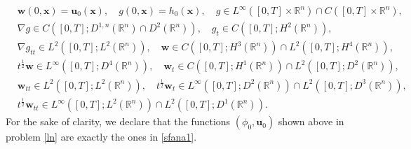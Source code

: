 \documentclass[11pt,reqno]{amsart}
\numberwithin{rk}{section}
\numberwithin{prop}{section}
\numberwithin{mydef}{section}
\numberwithin{lem}{section}
\numberwithin{equation}{section}
\numberwithin{thm}{section}
\begin{document}
\begin{equation*}
\begin{aligned}
&\boldsymbol{w}(0,\boldsymbol{x})=\boldsymbol{u}_0(\boldsymbol{x}),\quad g(0,\boldsymbol{x})=h_0(\boldsymbol{x}),\quad g\in L^\infty([0,T]\times \mathbb{R}^n)\cap C([0,T]\times \mathbb{R}^n),\\
& \nabla g\in C([0,T]; D^{1,n}(\mathbb{R}^n)\cap D^2(\mathbb{R}^n)),\quad  g_t\in C([0,T];H^2(\mathbb{R}^n)),\\
&\nabla g_{tt}\in L^2([0,T];L^2(\mathbb{R}^n)),\quad  \boldsymbol{w}\in C([0,T];H^3(\mathbb{R}^n))\cap L^2([0,T];H^4(\mathbb{R}^n)),\\ 
&t^{\frac{1}{2}}\boldsymbol{w}\in L^\infty([0,T];D^4(\mathbb{R}^n)),\quad \boldsymbol{w}_t\in C([0,T];H^1(\mathbb{R}^n))\cap L^2([0,T];D^2(\mathbb{R}^n)),\\
& \boldsymbol{w}_{tt}\in L^2([0,T];L^2(\mathbb{R}^n)),\quad 
t^{\frac{1}{2}}\boldsymbol{w}_t\in L^\infty([0,T];D^2(\mathbb{R}^n))\cap L^2([0,T];D^3(\mathbb{R}^n)),\\
&t^{\frac{1}{2}}\boldsymbol{w}_{tt}\in L^\infty([0,T];L^2(\mathbb{R}^n))\cap L^2([0,T];D^1(\mathbb{R}^n)).
\end{aligned}
\end{equation*}
For the sake of clarity, we declare that the functions $(\phi_0,\boldsymbol{u}_0)$  shown above in problem \eqref{ln} are exactly the ones in  \eqref{sfana1}.
\end{document}
